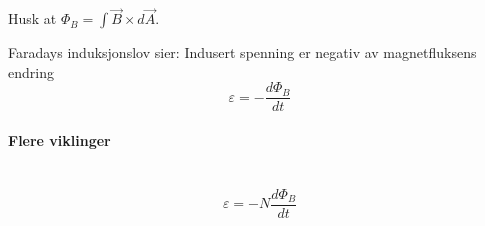 Husk at $\Phi_B = \int\vec{B}\times d\vec{A}$.

Faradays induksjonslov sier:
Indusert spenning er negativ av magnetfluksens endring
$$\varepsilon = -\frac{d\Phi_B}{dt}$$



\paragraph{Flere viklinger} \hfill \\
$$\varepsilon = -N\frac{d\Phi_B}{dt}$$
